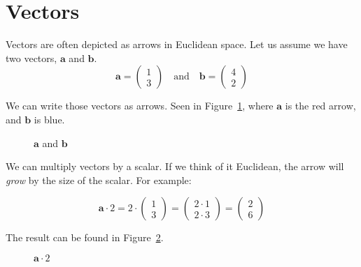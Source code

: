 \section{Vectors}%
\label{sec:vectors}

Vectors are often depicted as arrows in Euclidean space. Let us assume we have two vectors, $\mathbf{a}$ and $\mathbf{b}$.
\[
	\mathbf{a} = \begin{pmatrix} 1 \\ 3 \end{pmatrix}
	\quad \text{and} \quad
	\mathbf{b} = \begin{pmatrix} 4 \\ 2 \end{pmatrix}
\]

We can write those vectors as arrows. Seen in Figure~\ref{fig:aandb}, where $\mathbf{a}$ is the red arrow, and $\mathbf{b}$ is blue.
\begin{figure}[ht]
	\centering
	\caption{\label{fig:aandb} $\mathbf{a}$ and $\mathbf{b}$}
\end{figure}

We can multiply vectors by a scalar. If we think of it Euclidean, the arrow will \textit{grow} by the size of the scalar. For example:

\[
	\mathbf{a} \cdot 2 = 2 \cdot \begin{pmatrix}
		1 \\
		3
	\end{pmatrix} = \begin{pmatrix}
		2 \cdot 1 \\
		2 \cdot 3
	\end{pmatrix} = \begin{pmatrix}
		2 \\
		6
	\end{pmatrix}
\]

The result can be found in Figure~\ref{fig:scalarmultiplicationtovectors}.
\begin{figure}[ht]
	\centering
	\caption{\label{fig:scalarmultiplicationtovectors} $\mathbf{a} \cdot 2$}
\end{figure}

